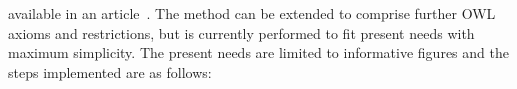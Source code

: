																																																																																																																																																																																																																																																																																																																																																																																																																																																																																																																																																			available in an article~\cite{losd}.
																																																																																																																																																																																																																																																																																																																																																																																																																																																																																																																																																			The method can be extended to comprise further OWL axioms and restrictions,
																																																																																																																																																																																																																																																																																																																																																																																																																																																																																																																																																			but is currently performed to fit present needs with maximum simplicity.
																																																																																																																																																																																																																																																																																																																																																																																																																																																																																																																																																			The present needs are limited to informative figures and
																																																																																																																																																																																																																																																																																																																																																																																																																																																																																																																																																			the steps implemented are as follows:
